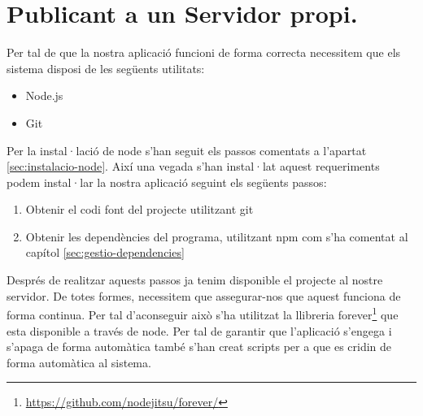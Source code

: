 \section{Publicant a un Servidor propi.}

Per tal de que la nostra aplicació funcioni de forma correcta necessitem que els sistema disposi de les següents utilitats:

\begin{itemize}
\item{Node.js}
\item{Git}
\end{itemize}

Per la instal·lació de node s'han seguit els passos comentats a l'apartat \ref{sec:instalacio-node}. Així una vegada s'han instal·lat aquest requeriments podem instal·lar la nostra aplicació seguint els següents passos: 

\begin{enumerate}
\item{Obtenir el codi font del projecte utilitzant git}
\item{Obtenir les dependències del programa, utilitzant npm com s'ha comentat al capítol \ref{sec:gestio-dependencies}}
\end{enumerate}

Després de realitzar aquests passos ja tenim disponible el projecte al nostre servidor. De totes formes, necessitem que assegurar-nos que aquest funciona de forma continua. Per tal d'aconseguir això s'ha utilitzat la llibreria forever\footnote{\url{https://github.com/nodejitsu/forever/}} que esta disponible a través de node. Per tal de garantir que l'aplicació s'engega i s'apaga de forma automàtica també s'han creat scripts per a que es cridin de forma automàtica al sistema. 

